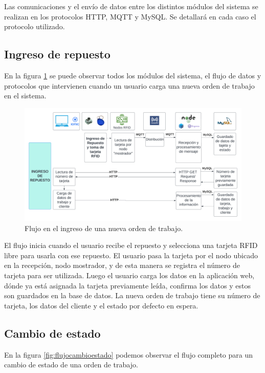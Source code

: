 Las comunicaciones y el envío de datos entre los distintos módulos del sistema se realizan en los protocolos HTTP, MQTT y MySQL. Se detallará en cada caso el protocolo utilizado.

\subsection{Ingreso de repuesto}
\label{subsec:ingresorepuesto}
En la figura \ref{fig:flujoingreso} se puede observar todos los módulos del sistema, el flujo de datos y protocolos que intervienen cuando un usuario carga una nueva orden de trabajo en el sistema.

\begin{figure}[ht]
	\centering
	\includegraphics[width=\textwidth]{./Figures/flujoingreso.png}
	\caption{Flujo en el ingreso de una nueva orden de trabajo.}
	\label{fig:flujoingreso}
\end{figure}
  
El flujo inicia cuando el usuario recibe el repuesto y selecciona una tarjeta RFID libre para usarla con ese repuesto. El usuario pasa la tarjeta por el nodo ubicado en la recepción, nodo mostrador, y de esta manera se registra el número de tarjeta para ser utilizada. Luego el usuario carga los datos en la aplicación web, dónde ya está asignada la tarjeta previamente leída, confirma los datos y estos son guardados en la base de datos. La nueva orden de trabajo tiene su número de tarjeta, los datos del cliente y el estado por defecto en espera.

\subsection{Cambio de estado}
\label{subsec:flujocambioestado}

En la figura \ref{fig:flujocambioestado} podemos observar el flujo completo para un cambio de estado de una orden de trabajo.

